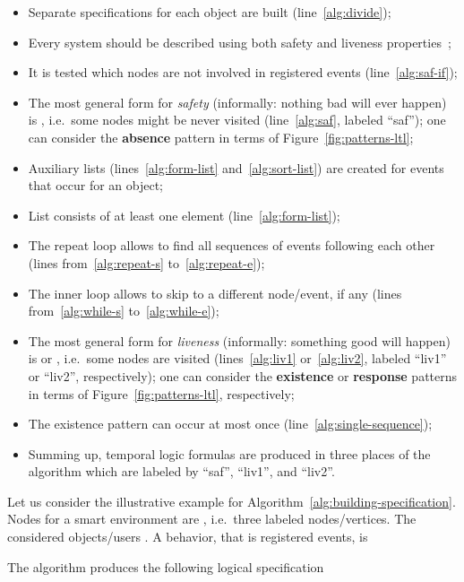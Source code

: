 \documentclass[runningheads,a4paper]{llncs}
\begin{document}
\begin{itemize}
  \item Separate specifications for each object are built (line~\ref{alg:divide});
  \item Every system should be described using both safety and liveness properties~\cite{Alpern-Schneider-1985};
  \item It is tested which nodes are not involved in registered events (line~\ref{alg:saf-if});
  \item The most general form for \emph{safety} (informally: nothing bad will ever happen) is ,
        i.e.\ some nodes might be never visited (line~\ref{alg:saf}, labeled ``saf'');
        one can consider the \textbf{absence} pattern in terms of Figure~\ref{fig:patterns-ltl};
  \item Auxiliary lists (lines~\ref{alg:form-list} and~\ref{alg:sort-list})
        are created for events that occur for an object;
  \item List  consists of at least one element (line~\ref{alg:form-list});
  \item The repeat loop allows to find all sequences of events following each other
       (lines from~\ref{alg:repeat-s} to~\ref{alg:repeat-e});
  \item The inner loop allows to skip to a different node/event, if any
       (lines from~\ref{alg:while-s} to~\ref{alg:while-e});
  \item The most general form for \emph{liveness} (informally: something good will happen) is  or ,
        i.e.\ some nodes are visited (lines~\ref{alg:liv1} or~\ref{alg:liv2}, labeled ``liv1'' or ``liv2'', respectively);
        one can consider the \textbf{existence} or \textbf{response} patterns in terms of Figure~\ref{fig:patterns-ltl}, respectively;
  \item The existence pattern can occur at most once (line~\ref{alg:single-sequence});
  \item Summing up, temporal logic formulas are produced in three places of the algorithm which are labeled by ``saf'', ``liv1'', and ``liv2''.
\end{itemize}

Let us consider the illustrative example for Algorithm~\ref{alg:building-specification}.
Nodes for a smart environment are ,
i.e.\ three labeled nodes/vertices.
The considered objects/users .
A behavior, that is registered events, is

The algorithm produces the following logical specification
\end{document}
